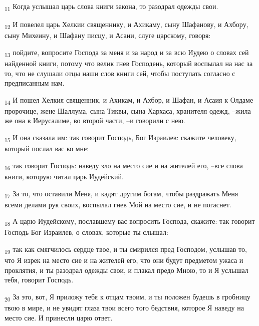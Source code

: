 \begin{tcolorbox}
\textsubscript{11} Когда услышал царь слова книги закона, то разодрал одежды свои.
\end{tcolorbox}
\begin{tcolorbox}
\textsubscript{12} И повелел царь Хелкии священнику, и Ахикаму, сыну Шафанову, и Ахбору, сыну Михеину, и Шафану писцу, и Асаии, слуге царскому, говоря:
\end{tcolorbox}
\begin{tcolorbox}
\textsubscript{13} пойдите, вопросите Господа за меня и за народ и за всю Иудею о словах сей найденной книги, потому что велик гнев Господень, который воспылал на нас за то, что не слушали отцы наши слов книги сей, чтобы поступать согласно с предписанным нам.
\end{tcolorbox}
\begin{tcolorbox}
\textsubscript{14} И пошел Хелкия священник, и Ахикам, и Ахбор, и Шафан, и Асаия к Олдаме пророчице, жене Шаллума, сына Тиквы, сына Хархаса, хранителя одежд, --жила же она в Иерусалиме, во второй части, --и говорили с нею.
\end{tcolorbox}
\begin{tcolorbox}
\textsubscript{15} И она сказала им: так говорит Господь, Бог Израилев: скажите человеку, который послал вас ко мне:
\end{tcolorbox}
\begin{tcolorbox}
\textsubscript{16} так говорит Господь: наведу зло на место сие и на жителей его, --все слова книги, которую читал царь Иудейский.
\end{tcolorbox}
\begin{tcolorbox}
\textsubscript{17} За то, что оставили Меня, и кадят другим богам, чтобы раздражать Меня всеми делами рук своих, воспылал гнев Мой на место сие, и не погаснет.
\end{tcolorbox}
\begin{tcolorbox}
\textsubscript{18} А царю Иудейскому, пославшему вас вопросить Господа, скажите: так говорит Господь Бог Израилев, о словах, которые ты слышал:
\end{tcolorbox}
\begin{tcolorbox}
\textsubscript{19} так как смягчилось сердце твое, и ты смирился пред Господом, услышав то, что Я изрек на место сие и на жителей его, что они будут предметом ужаса и проклятия, и ты разодрал одежды свои, и плакал предо Мною, то и Я услышал тебя, говорит Господь.
\end{tcolorbox}
\begin{tcolorbox}
\textsubscript{20} За это, вот, Я приложу тебя к отцам твоим, и ты положен будешь в гробницу твою в мире, и не увидят глаза твои всего того бедствия, которое Я наведу на место сие. И принесли царю ответ.
\end{tcolorbox}

